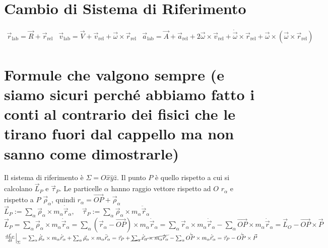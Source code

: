 \documentclass[a4paper,NoNotes,GeneralMath,12pt]{stdmdoc}
\begin{document}
	\section*{Cambio di Sistema di Riferimento}
	$\begin{array}{ccc} \vec{r}_{\text{lab}} = \vec{R} + \vec{r}_{\text{rel}} & \vec{v}_{\text{lab}} = \vec{V} + \vec{v}_{\text{rel}} + \vec{\omega} \times \vec{r}_{\text{rel}} & \vec{a}_{\text{lab}} = \vec{A} + \vec{a}_{\text{rel}} + 2 \vec{\omega} \times \vec{v}_{\text{rel}} + \dot{\vec{\omega}} \times \vec{r}_{\text{rel}} + \vec{\omega} \times \left( \vec{\omega} \times \vec{r}_{\text{rel}} \right) \end{array}$

	\section*{Formule che valgono sempre (e siamo sicuri perché abbiamo fatto i conti al contrario dei fisici che le tirano fuori dal cappello ma non sanno come dimostrarle)}
	Il sistema di riferimento è $\Sigma = O\hat{x}\hat{y}\hat{z}$. Il punto $P$ è quello rispetto a cui si calcolano $\vec{L}_P$ e $\vec{\tau}_P$. Le particelle $\alpha$ hanno raggio vettore rispetto ad $O$ $r_\alpha$ e rispetto a $P$ $\vec{\rho}_\alpha$, quindi $r_\alpha = \vec{OP} + \vec{\rho}_\alpha$ \\
	$\vec{L}_P := \sum_\alpha \vec{\rho}_\alpha \times m_\alpha \dot{\vec{r}}_\alpha , \quad \vec{\tau}_P := \sum_\alpha \vec{\rho}_\alpha \times m_\alpha \ddot{\vec{r}}_\alpha$ \\
	$\vec{L}_P = \sum_\alpha \vec{\rho}_\alpha \times m_\alpha \dot{\vec{r}}_\alpha = \sum_\alpha \left( \vec{r}_\alpha - \vec{OP} \right) \times m_\alpha \dot{\vec{r}}_\alpha = \sum_\alpha \vec{r}_\alpha \times m_\alpha \dot{\vec{r}}_\alpha - \sum_\alpha \vec{OP} \times m_\alpha \dot{\vec{r}}_\alpha = \vec{L}_O - \vec{OP} \times \vec{P}$ \\
	$\left. \de{\vec{L}_P}{t}\right|_\Sigma = \sum_\alpha \dot{\vec{\rho}}_\alpha \times m_\alpha \dot{\vec{r}}_\alpha +\sum_\alpha {\vec{\rho}}_\alpha \times m_\alpha \ddot{\vec{r}}_\alpha = \vec{\tau}_P + \cancel{\sum_\alpha \dot{\vec{r}}_\alpha \times m_\alpha \dot{\vec{r}}_\alpha } - \sum_\alpha \dot{\vec{OP}} \times m_\alpha \dot{\vec{r}}_\alpha = \vec{\tau}_P - \dot{\vec{OP}} \times \vec{P}$
\end{document}
